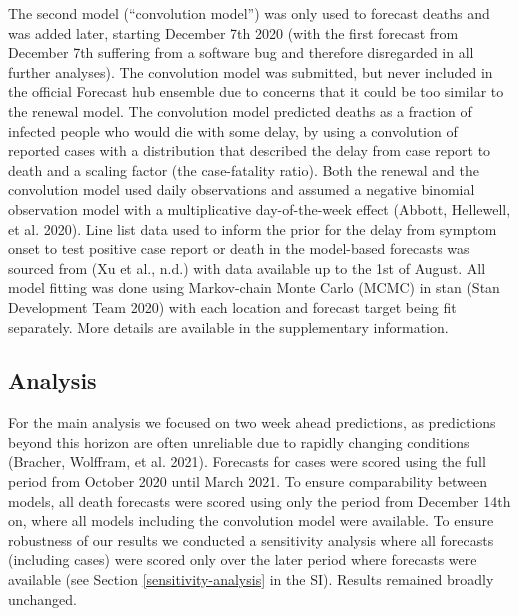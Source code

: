 \documentclass[
]{article}
\begin{document}
The second model (``convolution model'') was only used to forecast deaths and was added later, starting December 7th 2020 (with the first forecast from December 7th suffering from a software bug and therefore disregarded in all further analyses). The convolution model was submitted, but never included in the official Forecast hub ensemble due to concerns that it could be too similar to the renewal model. The convolution model predicted deaths as a fraction of infected people who would die with some delay, by using a convolution of reported cases with a distribution that described the delay from case report to death and a scaling factor (the case-fatality ratio). Both the renewal and the convolution model used daily observations and assumed a negative binomial observation model with a multiplicative day-of-the-week effect (Abbott, Hellewell, et al. 2020). Line list data used to inform the prior for the delay from symptom onset to test positive case report or death in the model-based forecasts was sourced from (Xu et al., n.d.) with data available up to the 1st of August. All model fitting was done using Markov-chain Monte Carlo (MCMC) in stan (Stan Development Team 2020) with each location and forecast target being fit separately. More details are available in the supplementary information.

\hypertarget{analysis}{%
\subsection{Analysis}\label{analysis}}

For the main analysis we focused on two week ahead predictions, as predictions beyond this horizon are often unreliable due to rapidly changing conditions (Bracher, Wolffram, et al. 2021). Forecasts for cases were scored using the full period from October 2020 until March 2021. To ensure comparability between models, all death forecasts were scored using only the period from December 14th on, where all models including the convolution model were available. To ensure robustness of our results we conducted a sensitivity analysis where all forecasts (including cases) were scored only over the later period where forecasts were available (see Section \ref{sensitivity-analysis} in the SI). Results remained broadly unchanged.
\end{document}
